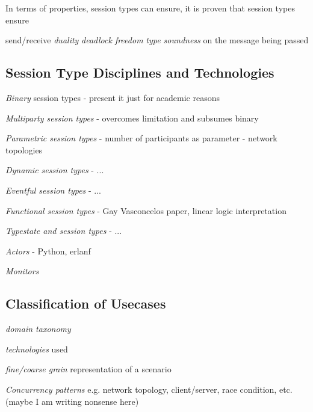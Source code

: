 In terms of properties, session types can ensure, it is proven
that session types ensure

send/receive {\em duality}
{\em deadlock freedom}
{\em type soundness} on the message being passed


\subsection{Session Type Disciplines and Technologies}


{\em Binary} session types - present it just for academic reasons

{\em Multiparty session types} - overcomes limitation and subsumes binary

{\em Parametric session types} - number of participants as parameter - network topologies

{\em Dynamic session types} - ...

{\em Eventful session types} - ...

{\em Functional session types} - Gay Vasconcelos paper, linear logic interpretation

{\em Typestate and session types} - ...

{\em Actors} - Python, erlanf

{\em Monitors}

\subsection{Classification of Usecases}

{\em domain taxonomy}

{\em technologies} used

{\em  fine/coarse grain} representation of a scenario

{\em Concurrency patterns} e.g. network topology, client/server, race condition, etc. (maybe I am writing nonsense here)


